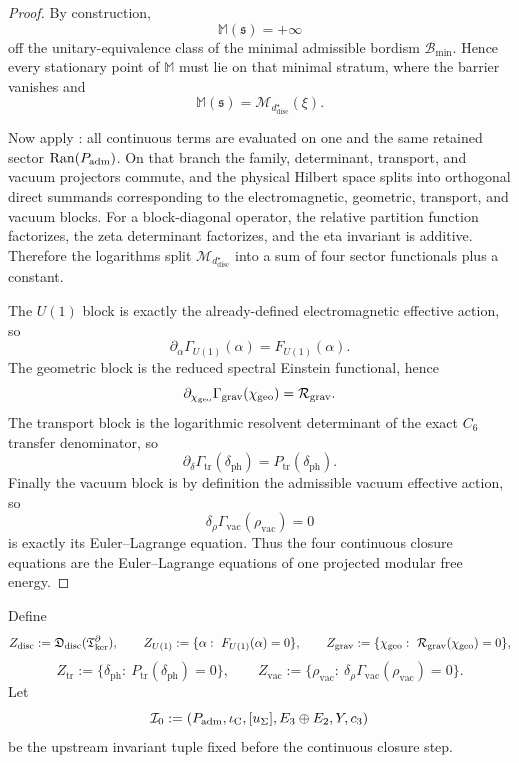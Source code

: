 \begin{proof}
By construction,
\[
\mathbb M(\mathfrak s)=+\infty
\]
off the unitary-equivalence class of the minimal admissible bordism $\mathcal B_{\min}$. Hence every
stationary point of $\mathbb M$ must lie on that minimal stratum, where the barrier vanishes and
\[
\mathbb M(\mathfrak s)=\mathcal M_{d^\star_{\mathrm{disc}}}(\xi).
\]

Now apply : all continuous terms are evaluated on one and the
same retained sector $\operatorname{Ran}(P_{\mathrm{adm}})$. On that branch the family, determinant, transport,
and vacuum projectors commute, and the physical Hilbert space splits into orthogonal direct summands
corresponding to the electromagnetic, geometric, transport, and vacuum blocks. For a block-diagonal
operator, the relative partition function factorizes, the zeta determinant factorizes, and the eta
invariant is additive. Therefore the logarithms split $\mathcal M_{d^\star_{\mathrm{disc}}}$ into a
sum of four sector functionals plus a constant.

The $U(1)$ block is exactly the already-defined electromagnetic effective action, so
\[
\partial_\alpha\Gamma_{U(1)}(\alpha)=F_{U(1)}(\alpha).
\]
The geometric block is the reduced spectral Einstein functional, hence
\[
\partial_{\chi_{\mathrm{geo}}}\Gamma_{\mathrm{grav}}(\chi_{\mathrm{geo}})=\mathcal R_{\mathrm{grav}}.
\]
The transport block is the logarithmic resolvent determinant of the exact $C_6$ transfer
denominator, so
\[
\partial_\delta\Gamma_{\mathrm{tr}}(\delta_{\mathrm{ph}})
=
P_{\mathrm{tr}}(\delta_{\mathrm{ph}}).
\]
Finally the vacuum block is by definition the admissible vacuum effective action, so
\[
\delta_\rho\Gamma_{\mathrm{vac}}(\rho_{\mathrm{vac}})=0
\]
is exactly its Euler--Lagrange equation. Thus the four continuous closure equations are the
Euler--Lagrange equations of one projected modular free energy.
\end{proof}

\begin{definition}
\label{def:intrinsic-closure-map}
\label{def:core-closure-functional}
\label{def:sector-solution-sets}
Define
\[
Z_{\mathrm{disc}}:=\mathfrak D_{\mathrm{disc}}(\mathfrak T_{\mathrm{ker}}^\partial),
\qquad
Z_{U(1)}:=\{\alpha:\ F_{U(1)}(\alpha)=0\},
\qquad
Z_{\mathrm{grav}}:=\{\chi_{\mathrm{geo}}:\ \mathcal R_{\mathrm{grav}}(\chi_{\mathrm{geo}})=0\},
\]
\[
Z_{\mathrm{tr}}:=\{\delta_{\mathrm{ph}}:\ P_{\mathrm{tr}}(\delta_{\mathrm{ph}})=0\},
\qquad
Z_{\mathrm{vac}}:=\{\rho_{\mathrm{vac}}:\ \delta_\rho\Gamma_{\mathrm{vac}}(\rho_{\mathrm{vac}})=0\}.
\]
Let
\[
\mathcal I_0
:=
(P_{\mathrm{adm}},\iota_{\mathrm C},[u_\Sigma],E_3\oplus E_2,Y,c_3)
\]
be the upstream invariant tuple fixed before the continuous closure step.
\end{definition}
